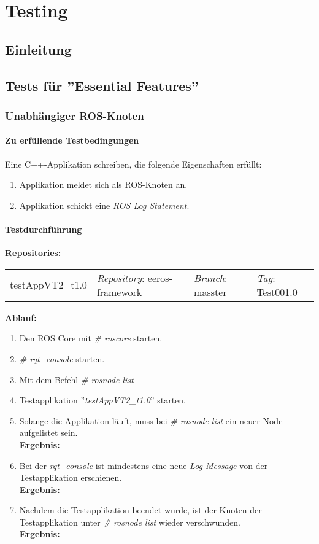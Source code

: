 \chapter{Testing}
\section{Einleitung}

\section{Tests für ''Essential Features''}
\subsection{Unabhängiger ROS-Knoten}
\subsubsection{Zu erfüllende Testbedingungen}
Eine C++-Applikation schreiben, die folgende Eigenschaften erfüllt:
\begin{enumerate}
\item Applikation meldet sich als ROS-Knoten an.
\item Applikation schickt eine \textit{ROS Log Statement}.
\end{enumerate}

\subsubsection{Testdurchführung}
\textbf{Repositories:} \\
\begin{tabular}
  { l						| l			 							l								 l								}
  testAppVT2\_t1.0			& \textit{Repository}: eeros-framework	& \textit{Branch}: masster		& \textit{Tag}: Test001.0 		\\
\end{tabular}

\textbf{Ablauf: }
\begin{enumerate}
\item Den ROS Core mit \textit{\# roscore} starten.
\item \textit{\# rqt\_console} starten.
\item Mit dem Befehl \textit{\# rosnode list} 
\item Testapplikation ''\textit{testAppVT2\_t1.0}'' starten.
\item Solange die Applikation läuft, muss bei \textit{\# rosnode list} ein neuer Node aufgelistet sein. \\
\textbf{Ergebnis:} \checkmark
\item Bei der \textit{rqt\_console} ist mindestens eine neue \textit{Log-Message} von der Testapplikation erschienen. \\
\textbf{Ergebnis:} \checkmark
\item Nachdem die Testapplikation beendet wurde, ist der Knoten der Testapplikation unter \textit{\# rosnode list} wieder verschwunden. \\
\textbf{Ergebnis:} \checkmark
\end{enumerate}


